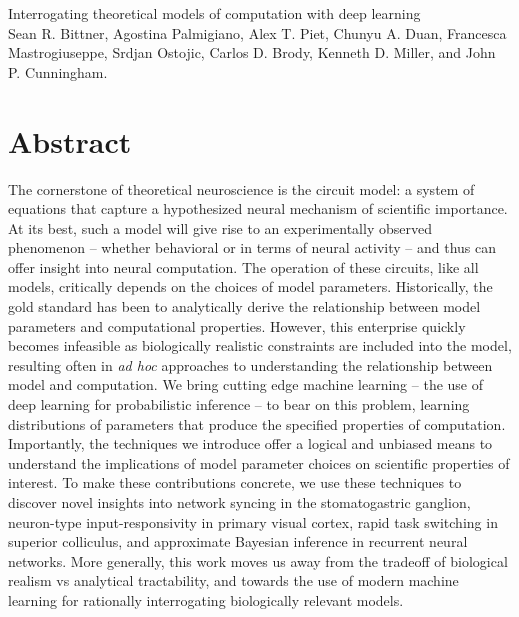 \documentclass[11pt]{article}
\begin{document}
\medskip                        %

\thispagestyle{plain}
{\Large Interrogating theoretical models of computation with deep learning} \\
Sean R. Bittner, Agostina Palmigiano, Alex T. Piet, Chunyu A. Duan, Francesca Mastrogiuseppe, Srdjan Ostojic, Carlos D. Brody, Kenneth D. Miller, and John P. Cunningham.

\linenumbers
\section{Abstract}
The cornerstone of theoretical neuroscience is the circuit model: a system of equations that capture a hypothesized neural mechanism of scientific importance.  At its best, such a model will give rise to an experimentally observed phenomenon -- whether behavioral or in terms of neural activity -- and thus can offer insight into neural computation.  The operation of these circuits, like all models, critically depends on the choices of model parameters.  Historically, the gold standard has been to analytically derive the relationship between model parameters and computational properties.  However, this enterprise quickly becomes infeasible as biologically realistic constraints are included into the model, resulting often in \emph{ad hoc} approaches to understanding the relationship between model and computation.  We bring cutting edge machine learning -- the use of deep learning for probabilistic inference -- to bear on this problem, learning distributions of parameters that produce the specified properties of computation.   Importantly, the techniques we introduce offer a logical and unbiased means to understand the implications of model parameter choices on scientific properties of interest.  To make these contributions concrete, we use these techniques to discover novel insights into network syncing in the stomatogastric ganglion, neuron-type input-responsivity in primary visual cortex, rapid task switching in superior colliculus, and approximate Bayesian inference in recurrent neural networks. More generally, this work moves us away from the tradeoff of biological realism vs analytical tractability, and towards the use of modern machine learning for rationally interrogating biologically relevant models.
\end{document}
